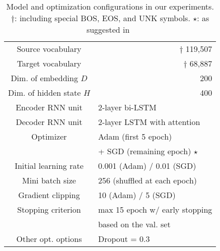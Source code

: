 \documentclass[11pt]{article}
\begin{document}
\begin{table}[t]
 \centering
 \small
 \tabcolsep=4pt
 \begin{tabular}{ c | r || c | r}
  \hline 
  Source vocabulary         & \multicolumn{3}{r}{$\dagger$ 119,507} \\
  Target vocabulary         & \multicolumn{3}{r}{$\dagger$  68,887} \\
  Dim. of embedding $D$     & \multicolumn{3}{r}{200}   \\
  Dim. of hidden state $H$  & \multicolumn{3}{r}{400}   \\
  \hline 
  Encoder RNN unit           & \multicolumn{3}{l}{2-layer bi-LSTM} \\
  Decoder RNN unit           & \multicolumn{3}{l}{2-layer LSTM with attention}   \\
   \hline
  Optimizer                  & \multicolumn{3}{l}{Adam (first 5 epoch)}\\
  \                          & \multicolumn{3}{l}{+ SGD (remaining epoch) $\star$ }\\
  Initial learning rate      & \multicolumn{3}{l}{0.001 (Adam) / 0.01 (SGD) } \\
  Mini batch size            & \multicolumn{3}{l}{256 (shuffled at each epoch) } \\
  Gradient clipping          & \multicolumn{3}{l}{10 (Adam) / 5 (SGD)}  \\
  Stopping criterion         & \multicolumn{3}{l}{max 15 epoch w/ early stopping}  \\
  \                          & \multicolumn{3}{l}{based on the val. set}  \\
  Other opt. options         & \multicolumn{3}{l}{Dropout = 0.3}               \\
    \hline
 \end{tabular}
 \caption{Model and optimization configurations in our experiments. $\dagger$: including special BOS, EOS, and UNK symbols. $\star$: as suggested in~\cite{DBLP:journals/corr/WuSCLNMKCGMKSJL16} }
  \label{table:configuration}
\end{table}
%
\end{document}
